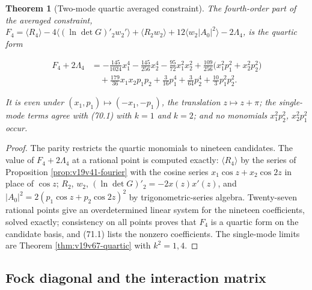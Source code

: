\documentclass[11pt]{article}
\newtheorem{theorem}{Theorem}[section]
\theoremstyle{remark}
\begin{document}
\begin{theorem}[Two-mode quartic averaged constraint]
\label{thm:v19v68-form}
The fourth-order part of the averaged constraint,
\(F_4=\langle R_4\rangle-4\langle(\ln\det G)'_2w_2'\rangle+\langle R_2w_2\rangle
+12\langle w_2|A_0|^2\rangle-2\Lambda_4\), is the quartic form

\[
\begin{aligned}
 F_4+2\Lambda_4
 &=-\frac{145}{1024}x_1^4-\frac{145}{256}x_2^4-\frac{95}{72}x_1^2x_2^2
 +\frac{109}{256}\bigl(x_1^2p_1^2+x_2^2p_2^2\bigr)\\
 &\quad+\frac{179}{36}x_1x_2p_1p_2
 +\frac{3}{16}p_1^4+\frac{3}{64}p_2^4+\frac{10}{3}p_1^2p_2^2 .
\end{aligned}                                                          \tag{71.1}
\]

It is even under \((x_1,p_1)\mapsto(-x_1,-p_1)\), the translation
\(z\mapsto z+\pi\); the single-mode terms agree with (70.1) with
\(k=1\) and \(k=2\); and no monomials \(x_1^2p_2^2\), \(x_2^2p_1^2\)
occur.
\end{theorem}

\begin{proof}
The parity restricts the quartic monomials to nineteen candidates.
The value of \(F_4+2\Lambda_4\) at a rational point is computed
exactly: \(\langle R_4\rangle\) by the series of Proposition
\ref{prop:v19v41-fourier} with the cosine series \(x_1\cos z+x_2\cos2z\)
in place of \(\cos z\); \(R_2\), \(w_2\), \((\ln\det G)'_2=-2x(z)x'(z)\),
and \(|A_0|^2=2(p_1\cos z+p_2\cos2z)^2\) by trigonometric-series
algebra.  Twenty-seven rational points give an overdetermined linear
system for the nineteen coefficients, solved exactly; consistency on
all points proves that \(F_4\) is a quartic form on the candidate
basis, and (71.1) lists the nonzero coefficients.  The single-mode
limits are Theorem \ref{thm:v19v67-quartic} with \(k^2=1,4\).
\end{proof}

\subsection{Fock diagonal and the interaction matrix}
\end{document}
